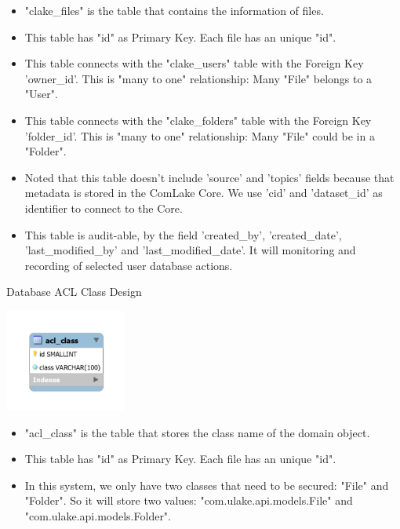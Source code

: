\begin{itemize}
    \item "clake\_files" is the table that contains the information of files.
    \item This table has "id" as Primary Key. Each file has an unique "id". 
    \item This table connects with the "clake\_users" table with the Foreign Key 'owner\_id'. This is "many to one" relationship: Many "File" belongs to a "User".
    \item This table connects with the "clake\_folders" table with the Foreign Key 'folder\_id'. This is "many to one" relationship: Many "File" could be in a "Folder". 
    \item Noted that this table doesn't include 'source' and 'topics' fields because that metadata is stored in the ComLake Core. We use 'cid' and 'dataset\_id' as identifier to connect to the Core. 
    \item This table is audit-able, by the field 'created\_by', 'created\_date', 'last\_modified\_by' and 'last\_modified\_date'. It will monitoring and recording of selected user database actions.
\end{itemize}

\begin{table}[H]
  \centering
  \caption{Database ACL Class Design}
  \label{tbl:dbACL}
  \includegraphics[width=0.3\textwidth]{images/DatabaseAclClassDesign.PNG}
\end{table}
\begin{itemize}
    \item "acl\_class" is the table that stores the class name of the domain object. 
    \item This table has "id" as Primary Key. Each file has an unique "id".
    \item In this system, we only have two classes that need to be secured: "File" and "Folder". So it will store two values: "com.ulake.api.models.File" and "com.ulake.api.models.Folder". 
\end{itemize}

